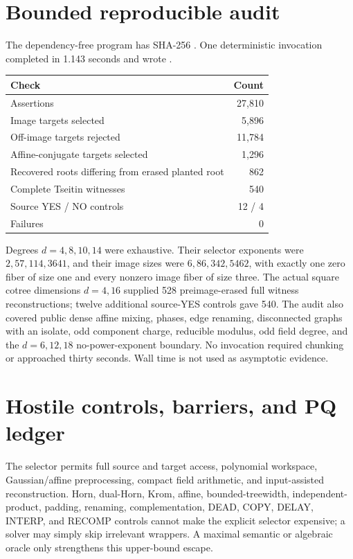 \documentclass[11pt]{article}
\begin{document}
\section{Bounded reproducible audit}
The dependency-free program
 has SHA-256
.
One deterministic invocation completed in 1.143 seconds and wrote
.

\begin{center}
\begin{tabular}{lr}
\toprule
Check & Count \\
\midrule
Assertions & 27,810 \\
Image targets selected & 5,896 \\
Off-image targets rejected & 11,784 \\
Affine-conjugate targets selected & 1,296 \\
Recovered roots differing from erased planted root & 862 \\
Complete Tseitin witnesses & 540 \\
Source YES / NO controls & 12 / 4 \\
Failures & 0 \\
\bottomrule
\end{tabular}
\end{center}

Degrees $d=4,8,10,14$ were exhaustive.  Their selector exponents were
$2,57,114,3641$, and their image sizes were $6,86,342,5462$, with exactly one
zero fiber of size one and every nonzero image fiber of size three.  The
actual square cotree dimensions $d=4,16$ supplied 528 preimage-erased full
witness reconstructions; twelve additional source-YES controls gave 540.
The audit also covered public dense affine mixing, phases, edge renaming,
disconnected graphs with an isolate, odd component charge, reducible modulus,
odd field degree, and the $d=6,12,18$ no-power-exponent boundary.  No
invocation required chunking or approached thirty seconds.  Wall time is not
used as asymptotic evidence.

\section{Hostile controls, barriers, and PQ ledger}
The selector permits full source and target access, polynomial workspace,
Gaussian/affine preprocessing, compact field arithmetic, and input-assisted
reconstruction.  Horn, dual-Horn, Krom, affine, bounded-treewidth,
independent-product, padding, renaming, complementation, DEAD, COPY, DELAY,
INTERP, and RECOMP controls cannot make the explicit selector expensive; a
solver may simply skip irrelevant wrappers.  A maximal semantic or algebraic
oracle only strengthens this upper-bound escape.
\end{document}
